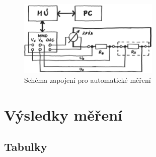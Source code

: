 \documentclass[a4paper, czech]{article}
\begin{document}
\begin{figure}[H]
    \centering
    \includegraphics[width=0.6\textwidth]{schema3a.png}
    \caption{Schéma zapojení pro automatické měření}
\end{figure}

\section{Výsledky měření}

\subsection{Tabulky}
\end{document}
